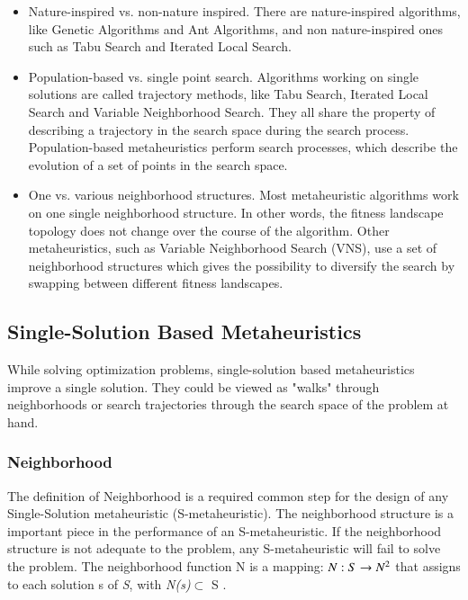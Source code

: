 \documentclass{bmcart}
\begin{document}
\begin{itemize}
\item Nature-inspired vs. non-nature inspired. There are nature-inspired algorithms, like Genetic Algorithms and Ant Algorithms, and non nature-inspired ones such as Tabu Search and Iterated Local Search. 

\item Population-based vs. single point search. Algorithms working on single solutions are called trajectory methods, like Tabu Search, Iterated Local Search and Variable Neighborhood Search. They all share the property of describing a trajectory in the search space during the search process. Population-based metaheuristics perform search processes, which describe the evolution of a set of points in the search space.

\item One vs. various neighborhood structures. Most metaheuristic algorithms work on one single neighborhood structure. In other words, the fitness landscape topology does not change over the course of the algorithm. Other metaheuristics, such as Variable Neighborhood Search (VNS), use a set of neighborhood structures which gives the possibility to diversify the search by swapping between different fitness
landscapes.
\end{itemize}

\subsection{Single-Solution Based Metaheuristics}

While solving optimization problems, single-solution based metaheuristics improve a single solution. They could be viewed as "walks" through neighborhoods or search trajectories through the search space of the problem at hand.
 

\subsubsection{Neighborhood}

The definition of Neighborhood is a required common step for the design of any Single-Solution metaheuristic (S-metaheuristic). The neighborhood structure is a important piece in the performance of an S-metaheuristic. If the neighborhood structure is not adequate to the problem,
any S-metaheuristic will fail to solve the problem. The neighborhood function N is a mapping: $ N : S \rightarrow N\textsuperscript{2} $ that assigns to each solution s of \textit{S}, with \textit{N(s)}$\subset$ S \citep{Talbi2013}.
\end{document}
